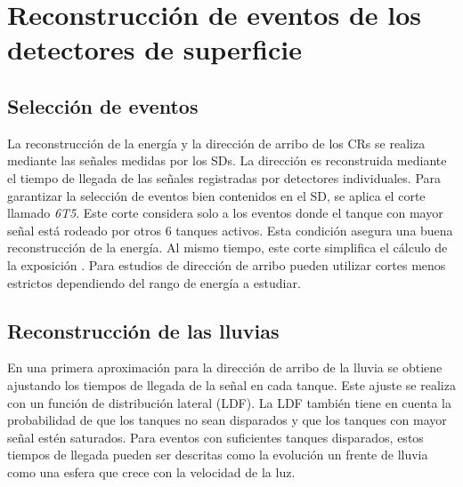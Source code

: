 \section{Reconstrucción de eventos de los detectores  de superficie}

\subsection{Selección de eventos}

La reconstrucción de la energía y la dirección de arribo de los CRs se realiza mediante las señales medidas por los SDs. La dirección es reconstruida mediante  el tiempo de llegada de las señales registradas por detectores individuales. Para garantizar la selección de eventos bien contenidos en el SD, se aplica el corte llamado \emph{6T5}. Este corte considera solo a los eventos donde el tanque con mayor señal está rodeado por otros 6 tanques activos. Esta condición asegura una buena reconstrucción de la energía. Al mismo tiempo, este corte simplifica el cálculo de la exposición \cite{exposure}. Para estudios de dirección de arribo pueden utilizar cortes menos estrictos dependiendo del rango de energía a estudiar.

\subsection{Reconstrucción de las lluvias}

En una primera aproximación para la dirección de arribo de la lluvia se obtiene ajustando los tiempos de llegada de la señal en cada tanque. Este ajuste se realiza con un función de distribución lateral (LDF). La LDF también tiene en cuenta la probabilidad de que los tanques no sean disparados y que los tanques con mayor señal estén saturados. Para eventos con suficientes tanques disparados, estos tiempos de llegada pueden ser descritas como la evolución un frente de lluvia como una esfera que crece con la velocidad de la luz.  

